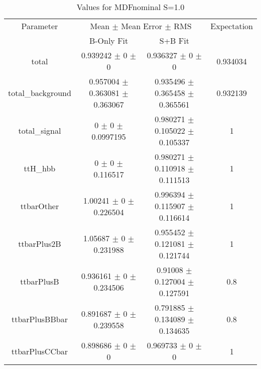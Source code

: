 \begin{table}
\centering
\caption{Values for MDFnominal S=1.0}
\begin{tabular}{cccc}
\toprule
Parameter & \multicolumn{2}{c}{Mean $\pm$ Mean Error $\pm$ RMS} & Expectation\\
 & B-Only Fit & S+B Fit & \\
\midrule
total & \num{0.939242} $\pm$ \num{0} $\pm$ \num{0} & \num{0.936327} $\pm$ \num{0} $\pm$ \num{0} & \num{0.934034}\\
total\_background & \num{0.957004} $\pm$ \num{0.363081} $\pm$ \num{0.363067} & \num{0.935496} $\pm$ \num{0.365458} $\pm$ \num{0.365561} & \num{0.932139}\\
total\_signal & \num{0} $\pm$ \num{0} $\pm$ \num{0.0997195} & \num{0.980271} $\pm$ \num{0.105022} $\pm$ \num{0.105337} & \num{1}\\
ttH\_hbb & \num{0} $\pm$ \num{0} $\pm$ \num{0.116517} & \num{0.980271} $\pm$ \num{0.110918} $\pm$ \num{0.111513} & \num{1}\\
ttbarOther & \num{1.00241} $\pm$ \num{0} $\pm$ \num{0.226504} & \num{0.996394} $\pm$ \num{0.115907} $\pm$ \num{0.116614} & \num{1}\\
ttbarPlus2B & \num{1.05687} $\pm$ \num{0} $\pm$ \num{0.231988} & \num{0.955452} $\pm$ \num{0.121081} $\pm$ \num{0.121744} & \num{1}\\
ttbarPlusB & \num{0.936161} $\pm$ \num{0} $\pm$ \num{0.234506} & \num{0.91008} $\pm$ \num{0.127004} $\pm$ \num{0.127591} & \num{0.8}\\
ttbarPlusBBbar & \num{0.891687} $\pm$ \num{0} $\pm$ \num{0.239558} & \num{0.791885} $\pm$ \num{0.134089} $\pm$ \num{0.134635} & \num{0.8}\\
ttbarPlusCCbar & \num{0.898686} $\pm$ \num{0} $\pm$ \num{0} & \num{0.969733} $\pm$ \num{0} $\pm$ \num{0} & \num{1}\\
\bottomrule
\end{tabular}
\end{table}